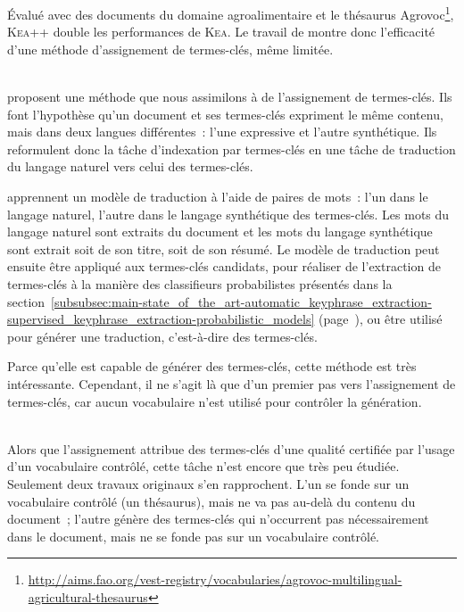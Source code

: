     Évalué avec des documents du domaine agroalimentaire et le thésaurus
    Agrovoc\footnote{\url{http://aims.fao.org/vest-registry/vocabularies/agrovoc-multilingual-agricultural-thesaurus}},
    \textsc{Kea}++ double les performances de \textsc{Kea}. Le travail de
     montre donc l'efficacité d'une méthode
    d'assignement de termes-clés, même limitée.

    ~\\ proposent une méthode que nous assimilons
    à de l'assignement de termes-clés. Ils font l'hypothèse qu'un document et
    ses termes-clés expriment le même contenu, mais dans deux langues
    différentes~: l'une expressive et l'autre synthétique. Ils reformulent donc
    la tâche d'indexation par termes-clés en une tâche de traduction du langage
    naturel vers celui des termes-clés.
    
     apprennent un modèle de traduction à l'aide
    de paires de mots~: l'un dans le langage naturel, l'autre dans le langage
    synthétique des termes-clés. Les mots du langage naturel sont extraits du document et les
    mots du langage synthétique sont extrait soit de son titre, soit de son
    résumé. Le modèle de traduction peut ensuite être appliqué aux termes-clés
    candidats, pour réaliser de l'extraction de termes-clés à la manière des
    classifieurs probabilistes présentés dans la
    section~\ref{subsubsec:main-state_of_the_art-automatic_keyphrase_extraction-supervised_keyphrase_extraction-probabilistic_models}
    (page~\pageref{subsubsec:main-state_of_the_art-automatic_keyphrase_extraction-supervised_keyphrase_extraction-probabilistic_models}),
    ou être utilisé pour générer une traduction, c'est-à-dire des termes-clés.

    Parce qu'elle est capable de générer des termes-clés, cette méthode est très
    intéressante. Cependant, il ne s'agit là que d'un premier pas vers
    l'assignement de termes-clés, car aucun vocabulaire n'est utilisé pour
    contrôler la génération.

    ~\\Alors que l'assignement attribue des termes-clés d'une qualité certifiée
    par l'usage d'un vocabulaire contrôlé, cette tâche n'est encore que très peu
    étudiée. Seulement deux travaux originaux s'en rapprochent. L'un se fonde
    sur un vocabulaire contrôlé (un thésaurus), mais ne va pas au-delà du
    contenu du document~; l'autre génère des termes-clés qui n'occurrent pas
    nécessairement dans le document, mais ne se fonde pas sur un vocabulaire
    contrôlé.


